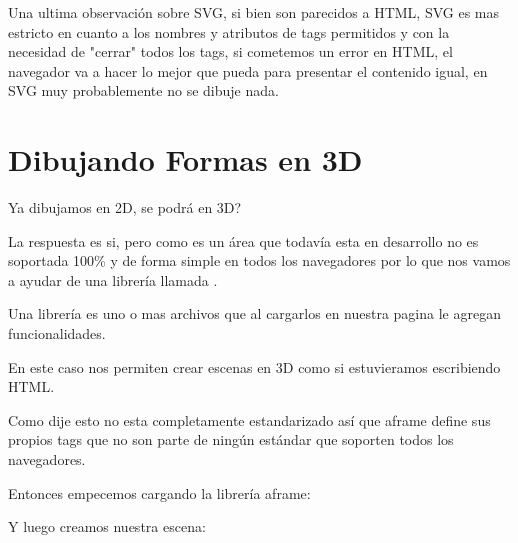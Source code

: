 \documentclass[letterpaper,10pt,spanish]{sphinxmanual}
\begin{document}

Una ultima observación sobre SVG, si bien son parecidos a HTML, SVG es mas
estricto en cuanto a los nombres y atributos de tags permitidos y con la
necesidad de "cerrar" todos los tags, si cometemos un error en HTML, el
navegador va a hacer lo mejor que pueda para presentar el contenido igual, en
SVG muy probablemente no se dibuje nada.


\chapter{Dibujando Formas en 3D}
\label{\detokenize{dibujando-en-3d::doc}}\label{\detokenize{dibujando-en-3d:dibujando-formas-en-3d}}
Ya dibujamos en 2D, se podrá en 3D?

La respuesta es si, pero como es un área que todavía esta en desarrollo no
es soportada 100\% y de forma simple en todos los navegadores por lo que nos
vamos a ayudar de una librería llamada .

Una librería es uno o mas archivos que al cargarlos en nuestra pagina le
agregan funcionalidades.

En este caso nos permiten crear escenas en 3D como si estuvieramos escribiendo
HTML.

Como dije esto no esta completamente estandarizado así que aframe define sus
propios tags que no son parte de ningún estándar que soporten todos los
navegadores.

Entonces empecemos cargando la librería aframe:

%
\begin{sphinxVerbatim}[commandchars=\\\{\}]
 
\end{sphinxVerbatim}



Y luego creamos nuestra escena:
\end{document}
